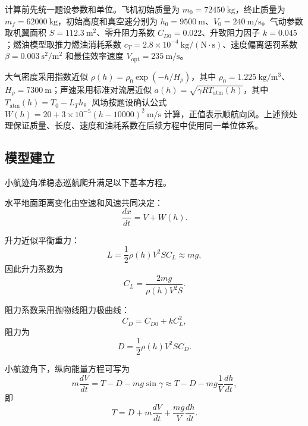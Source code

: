 \documentclass[withoutpreface,bwprint]{cumcmthesis}
\begin{document}
计算前先统一题设参数和单位。飞机初始质量为 $m_0=72450\ \mathrm{kg}$，终止质量为 $m_f=62000\ \mathrm{kg}$，初始高度和真空速分别为 $h_0=9500\ \mathrm{m}$、$V_0=240\ \mathrm{m/s}$。气动参数取机翼面积 $S=112.3\ \mathrm{m^2}$、零升阻力系数 $C_{D0}=0.022$、升致阻力因子 $k=0.045$；燃油模型取推力燃油消耗系数 $c_T=2.8\times 10^{-4}\ \mathrm{kg/(N\cdot s)}$、速度偏离惩罚系数 $\beta=0.003\ \mathrm{s^2/m^2}$ 和最佳效率速度 $V_{\mathrm{opt}}=235\ \mathrm{m/s}$。

大气密度采用指数近似 $\rho(h)=\rho_0\exp(-h/H_\rho)$，其中 $\rho_0=1.225\ \mathrm{kg/m^3}$、$H_\rho=7300\ \mathrm{m}$；声速采用标准对流层近似 $a(h)=\sqrt{\gamma R T_{\mathrm{atm}}(h)}$，其中 $T_{\mathrm{atm}}(h)=T_0-L_T h$。风场按题设确认公式 $W(h)=20+3\times 10^{-5}(h-10000)^2\ \mathrm{m/s}$ 计算，正值表示顺航向风。上述预处理保证质量、长度、速度和油耗系数在后续方程中使用同一单位体系。

\subsection{模型建立}

小航迹角准稳态巡航爬升满足以下基本方程\cite{raymer,cook}。

水平地面距离变化由空速和风速共同决定：
\begin{equation}
\frac{dx}{dt}=V+W(h).
\label{eq:dxdt}
\end{equation}

升力近似平衡重力：
\begin{equation}
L=\frac{1}{2}\rho(h)V^2SC_L\approx mg,
\label{eq:lift}
\end{equation}
因此升力系数为
\begin{equation}
C_L=\frac{2mg}{\rho(h)V^2S}.
\label{eq:CL}
\end{equation}

阻力系数采用抛物线阻力极曲线\cite{anderson}：
\begin{equation}
C_D=C_{D0}+kC_L^2,
\label{eq:CD}
\end{equation}
阻力为
\begin{equation}
D=\frac{1}{2}\rho(h)V^2SC_D.
\label{eq:drag}
\end{equation}

小航迹角下，纵向能量方程可写为
\begin{equation}
m\frac{dV}{dt}=T-D-mg\sin\gamma\approx T-D-mg\frac{1}{V}\frac{dh}{dt},
\label{eq:energy}
\end{equation}
即
\begin{equation}
T=D+m\frac{dV}{dt}+\frac{mg}{V}\frac{dh}{dt}.
\label{eq:thrust}
\end{equation}
\end{document}
